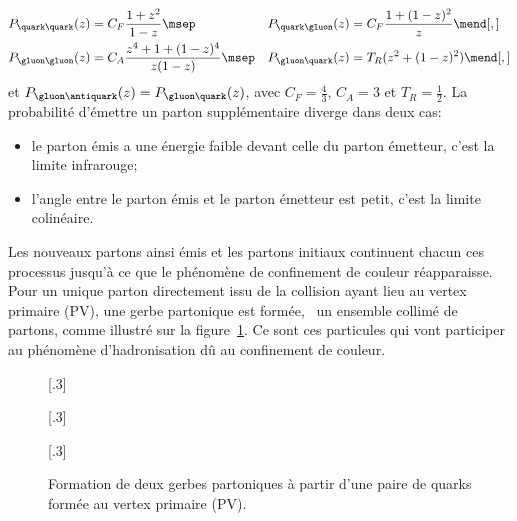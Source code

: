 \begin{align}
P_{\quark\quark}(z) &= C_F \frac{1+z^2}{1-z} \msep&
P_{\quark\gluon}(z) &= C_F \frac{1+(1-z)^2}{z} \mend[,]
\\
P_{\gluon\gluon}(z) &= C_A \frac{z^4 + 1 + (1-z)^4}{z(1-z)} \msep&
P_{\gluon\quark}(z) &= T_R (z^2+(1-z)^2) \mend[,]
\end{align}
et $P_{\gluon\antiquark}(z) = P_{\gluon\quark}(z)$,
avec
$C_F=\frac{4}{3}$,
$C_A = 3$ et
$T_R=\frac{1}{2}$.
La probabilité d'émettre un parton supplémentaire diverge dans deux cas:
\begin{itemize}
\item le parton émis a une énergie faible devant celle du parton émetteur, c'est la limite infrarouge;
\item l'angle entre le parton émis et le parton émetteur est petit, c'est la limite colinéaire.
\end{itemize}
\par Les nouveaux partons ainsi émis et les partons initiaux continuent chacun ces processus jusqu'à ce que le phénomène de confinement de couleur réapparaisse. Pour un unique parton directement issu de la collision ayant lieu au vertex primaire (PV), une gerbe partonique est formée, \ie\ un ensemble collimé de partons, comme illustré sur la figure~\ref{fig-parton_shower}.
Ce sont ces particules qui vont participer au phénomène d'hadronisation dû au confinement de couleur.
\begin{figure}[h]
\centering
{}[.3\textwidth]
{\begin{tikzpicture}

\end{tikzpicture}}
\hfill
{}[.3\textwidth]
{\begin{tikzpicture}


\end{tikzpicture}}
\hfill
{}[.3\textwidth]
{\begin{tikzpicture}



\end{tikzpicture}}

\caption[Formation de deux gerbes partoniques.]{Formation de deux gerbes partoniques à partir d'une paire de quarks formée au vertex primaire (PV).}
\label{fig-parton_shower}
\end{figure}

